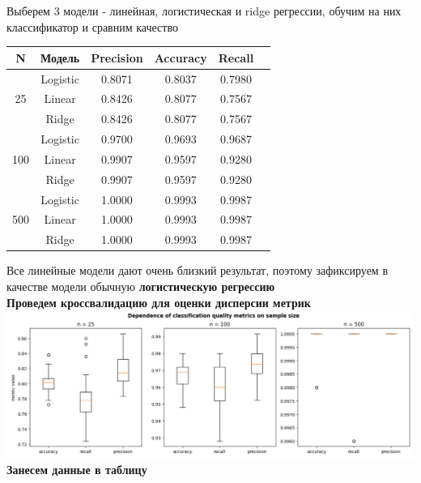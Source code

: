 
Выберем 3 модели - линейная, логистическая и ridge регрессии, обучим на них классификатор и сравним качество

\begin{table}[h]
    \centering
    \label{tab:results}
    \begin{tabular}{cccccc}
    \toprule
    N & Модель & Precision & Accuracy & Recall \\
    \midrule
    \multirow{3}{*}{25} 
        & Logistic & 0.8071 & 0.8037 & 0.7980 \\
        & Linear & 0.8426 & 0.8077 & 0.7567 \\
        & Ridge & 0.8426 & 0.8077 & 0.7567 \\
    \hline
    \multirow{3}{*}{100} 
        & Logistic & 0.9700 & 0.9693 & 0.9687 \\
        & Linear & 0.9907 & 0.9597 & 0.9280 \\
        & Ridge & 0.9907 & 0.9597 & 0.9280 \\
    \hline
    \multirow{3}{*}{500} 
        & Logistic & 1.0000 & 0.9993 & 0.9987 \\
        & Linear & 1.0000 & 0.9993 & 0.9987 \\
        & Ridge & 1.0000 & 0.9993 & 0.9987 \\
    \bottomrule
    \end{tabular}
\end{table}

Все линейные модели дают очень близкий результат, поэтому зафиксируем в качестве модели обычную \textbf{логистическую регрессию}\\

\textbf{Проведем кроссвалидацию для оценки дисперсии метрик}\\

\hspace*{-1cm}
\includegraphics[width=1\textwidth]{Part-II_student-2/dependence metrics on sample size}\\ 

\textbf{Занесем данные в таблицу}\\

